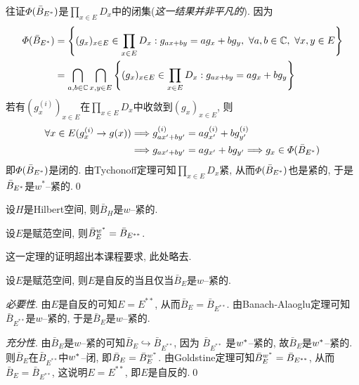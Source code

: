 \begin{Proof}
    往证$ \varPhi(\bar{B}_{E^{*}}) $是$ \prod\limits_{x\in E}D_x $中的闭集(\textsl{这一结果并非平凡的}). 因为
    \[
    \begin{aligned}
    \varPhi(\bar{B}_{\Star{E}})&=\left\{ (g_x)_{x\in E}\in\prod_{x\in E}D_x : g_{ax+by}=ag_x+bg_y,\ \forall a,b\in\C,\ \forall x,y\in E \right\}\\
    &=\bigcap_{a,b\in\C}\bigcap_{x,y\in E}\left\{ (g_x)_{x\in E}\in\prod_{x\in E}D_x : g_{ax+by}=ag_x+bg_y \right\}
    \end{aligned}
    \]
    若有$ (g_x^{(i)})_{x\in E} $在$ \prod\limits_{x\in E}D_x $中收敛到$ (g_x)_{x\in E} $, 则
    \[
    \begin{aligned}
    \forall x\in E(g_x^{(i)}\to g(x))&\Longrightarrow g_{ax'+by'}^{(i)}=ag_{x'}^{(i)}+bg_{y'}^{(i)}\\
    &\Longrightarrow g_{ax'+by'}=ag_{x'}+bg_{y'}\Longrightarrow g_x\in\varPhi(\bar{B}_{E^{*}})
    \end{aligned}
    \]
    即$ \varPhi(\bar{B}_{E^{*}}) $是闭的. 由Tychonoff定理可知$ \prod\limits_{x\in E}D_x $紧, 从而$ \varPhi(\bar{B}_{E^{*}}) $也是紧的, 于是$ \bar{B}_{E^{*}} $是$ w^* $--紧的.\qed
    \end{Proof}
    
    \begin{Corollary}
    设$ H $是Hilbert空间, 则$ \bar{B}_H $是$ w $--紧的.
    \end{Corollary}
    
    \begin{Theorem}[Goldstine]
    设$ E $是赋范空间, 则$ \bar{B}_E^{w^{*}}=\bar{B}_{E^{**}} $.
    \end{Theorem}
    
    这一定理的证明超出本课程要求, 此处略去.
    
    \begin{Corollary}[Banach]
    设$ E $是赋范空间, 则$ E $是自反的当且仅当$ \bar{B}_E $是$ w $--紧的.
    \end{Corollary}
    \begin{Proof}
    \textsl{必要性}. 由$ E $是自反的可知$ E=E^{**} $, 从而$ \bar{B}_E=\bar{B}_{E^{**}} $. 由Banach-Alaoglu定理可知$ \bar{B}_{E^{**}} $是$ w $--紧的, 于是$ \bar{B}_E $是$ w $--紧的.
    
    \textsl{充分性}. 由$ \bar{B}_E $是$ w $--紧的可知$ \bar{B}_E\hookrightarrow\bar{B}_{E^{**}} $, 因为 $ \bar{B}_{E^{**}} $ 是$ w^{*} $--紧的, 故$ \bar{B}_E $是$ w^{*} $--紧的. 则$ \bar{B}_E $在$ \bar{B}_{E^{**}} $中$ w^{*} $--闭, 即$ \bar{B}_E=\bar{B}_E^{w^{*}} $. 由Goldstine定理可知$ \bar{B}_E^{w^{*}}=\bar{B}_{E^{**}} $, 从而$ \bar{B}_E=\bar{B}_{E^{**}} $, 这说明$ E=E^{**} $, 即$ E $是自反的.\qed
    \end{Proof}
    

